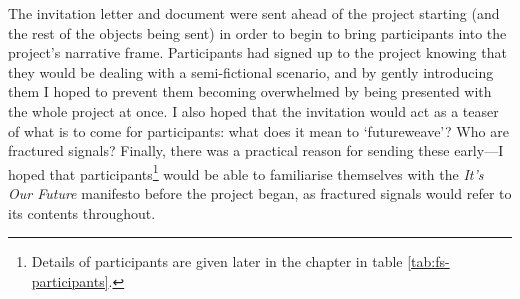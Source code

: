 The invitation letter and document were sent ahead of the project starting (and the rest of the objects being sent) in order to begin to bring participants into the project's narrative frame. Participants had signed up to the project knowing that they would be dealing with a semi-fictional scenario, and by gently introducing them I hoped to prevent them becoming overwhelmed by being presented with the whole project at once. I also hoped that the invitation would act as a teaser of what is to come for participants: what does it mean to `futureweave'? Who are fractured signals? Finally, there was a practical reason for sending these early—I hoped that participants\footnote{Details of participants are given later in the chapter in table \ref{tab:fs-participants}.} would be able to familiarise themselves with the \emph{It's Our Future} manifesto before the project began, as fractured signals would refer to its contents throughout. 

